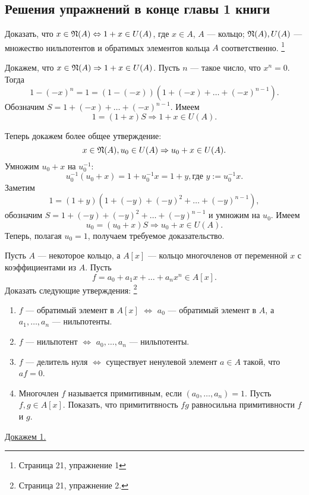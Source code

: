     \subsection{Решения упражнений в конце главы 1 книги \cite{A-M}}
    \begin{Ex} \label{ex_1}
        Доказать, что $x \in \mathfrak{N}(A) \Leftrightarrow 1 + x \in U(A)$, где $x \in A$, $A$ --- кольцо; $\mathfrak{N}(A), U(A)$ --- множество нильпотентов и 
        обратимых элементов кольца $A$ соответственно.
        \footnote{\cite{A-M} Страница 21, упражнение 1}
    \end{Ex}
    \begin{Proof}

        Докажем, что $x \in \mathfrak{N}(A) \Rightarrow 1+x \in U(A)$.
        Пусть $n$ --- такое число, что $x^n = 0$. Тогда
        $$
            1 - (-x)^n = 1 = (1 - (-x))(1 + (-x) + \dots + (-x)^{n-1}).
        $$
        Обозначим $S = 1 + (-x) + \dots + (-x)^{n-1}$. Имеем 
        $$
            1 = (1 + x)S \Rightarrow 1 + x \in U(A).
        $$

        Теперь докажем более общее утверждение: 
        $$
            x \in \mathfrak{N}(A), u_0 \in U(A) \Rightarrow u_0 + x \in U(A).
        $$
        Умножим $u_0 + x$ на $u_0^{-1}$:
        $$
            u_0^{-1}(u_0 + x) = 1 + u_0^{-1}x = 1 + y, \text{где } y := u_0^{-1}x.
        $$
        Заметим
        $$
            1 = (1 + y)(1 + (-y) + (-y)^2 + \dots + (-y)^{n-1}),
        $$
        обозначим $S = 1 + (-y) + (-y)^2 + \dots + (-y)^{n-1}$ и умножим на $u_0$. Имеем
        $$
            u_0 = (u_0 + x)S \Rightarrow u_0 + x \in U(A).
        $$
        Теперь, полагая $u_0 = 1$, получаем требуемое доказательство.
    \end{Proof}

    
    \begin{Ex} \label{ex_2}
        Пусть $A$ --- некоторое кольцо, а $A[x]$ --- кольцо многочленов от переменной $x$ с коэффициентами из $A$. Пусть
        $$
            f = a_0 + a_1x + \dots + a_nx^n \in A[x].
        $$
        Доказать следующие утверждения: \footnote{\cite{A-M} Страница 21, упражнение 2.}
    \begin{enumerate}
            \item $f$ --- обратимый элемент в $A[x]$ $\Leftrightarrow$ $a_0$ --- обратимый элемент в $A$, а \linebreak $a_1, \dots, a_n$ --- нильпотенты.
            \item $f$ --- нильпотент $\Leftrightarrow$ $a_0, \dots, a_n$ --- нильпотенты.
            \item $f$ --- делитель нуля $\Leftrightarrow$ существует ненулевой элемент $a \in A$ такой, что $af = 0$.
            \item Многочлен $f$ называется примитивным, если $(a_0, \dots, a_n) = 1$. Пусть $f, g \in A[x]$. Показать, что примититвность
                $fg$ равносильна примитивности $f$ и $g$. 
        \end{enumerate}
    \end{Ex}
    \underline{Докажем 1.}

